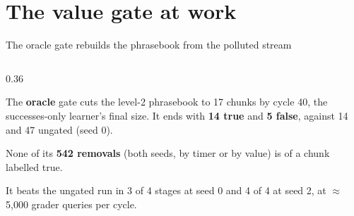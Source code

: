 \documentclass[aspectratio=169,11pt]{beamer}
\newcommand{\oracletext}[1]{\textcolor{armoracle}{\textbf{#1}}}
\begin{document}
\section{The value gate at work}

\begin{frame}{The oracle gate rebuilds the phrasebook from the polluted stream}
\begin{columns}[T]
\begin{column}{0.36\textwidth}
{\small The \oracletext{oracle} gate cuts the level-2 phrasebook to 17 chunks by cycle 40, the successes-only learner's final size. It ends with \textbf{14 true} and \textbf{5 false}, against 14 and 47 ungated (seed 0).\par}

\smallskip
{\small None of its \textbf{542 removals} (both seeds, by timer or by value) is of a chunk labelled true.\par}

\smallskip
{\small It beats the ungated run in 3 of 4 stages at seed 0 and 4 of 4 at seed 2, at $\approx$5{,}000 grader queries per cycle.\par}
\end{column}


\end{columns}
\end{frame}
\end{document}
